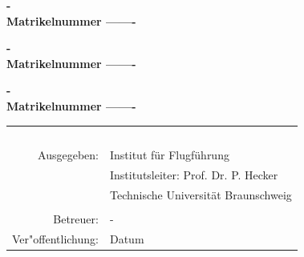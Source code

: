 \begin{titlepage}
 \textbf{\large -} \\[0.5ex]
 \textbf{Matrikelnummer -------}
 
 \textbf{\large -} \\[0.5ex]
 \textbf{Matrikelnummer -------}
 
 \textbf{\large -} \\[0.5ex]
 \textbf{Matrikelnummer -------}
 

 

 



 \vspace*{2.5cm}

 \begin{table}[htbp]
  \begin{center}
   \begin{tabular}{rl} 
     \parbox{0.33\textwidth}{\mbox{ }} & \parbox{0.66\textwidth}{\mbox{ }} \\
     Ausgegeben: & Institut f\" ur Flugf\" uhrung \\
                 & Institutsleiter: Prof. Dr. P. Hecker \\
                 & Technische Universit\" at Braunschweig \\
                 &  \\
       Betreuer: & -\\
 Ver"offentlichung: & Datum \\
   \end{tabular}
  \end{center}
 \end{table}



\end{titlepage}

